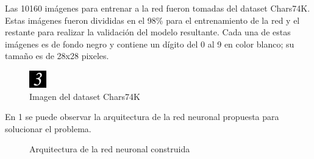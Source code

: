 \documentclass{article}
\begin{document}
Las 10160 im\'agenes para entrenar a la red fueron tomadas del dataset Chars74K. Estas im\'agenes fueron divididas en el 98\% para el entrenamiento de la red y el restante para realizar la validaci\'on del modelo resultante. Cada una de estas im\'agenes es de fondo negro y contiene un d\'igito del 0 al 9 en color blanco; su tama\~no es de 28x28 pixeles.
\begin{figure}[H]
  \caption{Imagen del dataset Chars74K}
  \centering
  \includegraphics[]{dtimgexample}
\end{figure}

En 1 se puede observar la arquitectura de la red neuronal propuesta para solucionar el problema.
\begin{figure}[H]
  \caption{Arquitectura de la red neuronal construida}
  \centering

\end{figure}
\end{document}
